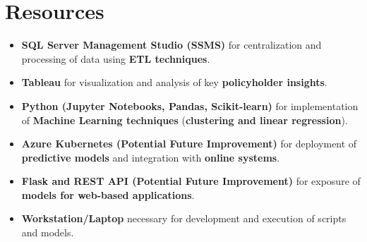 \section{Resources}

\begin{itemize}
    \item \textbf{SQL Server Management Studio (SSMS)} 
          for centralization and processing of data using 
          \textbf{ETL techniques}.
    \item \textbf{Tableau} for visualization and analysis 
          of key \textbf{policyholder insights}.
    \item \textbf{Python (Jupyter Notebooks, Pandas, 
          Scikit-learn)} for implementation of \textbf{Machine 
          Learning techniques} (\textbf{clustering and linear 
          regression}).
    \item \textbf{Azure Kubernetes (Potential Future 
          Improvement)} for deployment of \textbf{predictive 
          models} and integration with \textbf{online systems}.
    \item \textbf{Flask and REST API (Potential Future 
          Improvement)} for exposure of \textbf{models for 
          web-based applications}.
    \item \textbf{Workstation/Laptop} necessary for 
          development and execution of scripts and models.
\end{itemize}